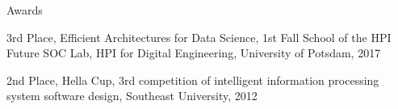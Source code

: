 \documentclass{resume} %
\begin{document}



\begin{rSection}{Awards} \itemsep -3pt
  \item 3rd Place, Efficient Architectures for Data Science, 1st Fall School of the HPI Future SOC Lab, HPI for Digital Engineering, University of Potsdam, 2017
  \item 2nd Place, Hella Cup, 3rd competition of intelligent information processing system software design, Southeast University, 2012
\end{rSection}
\end{document}
